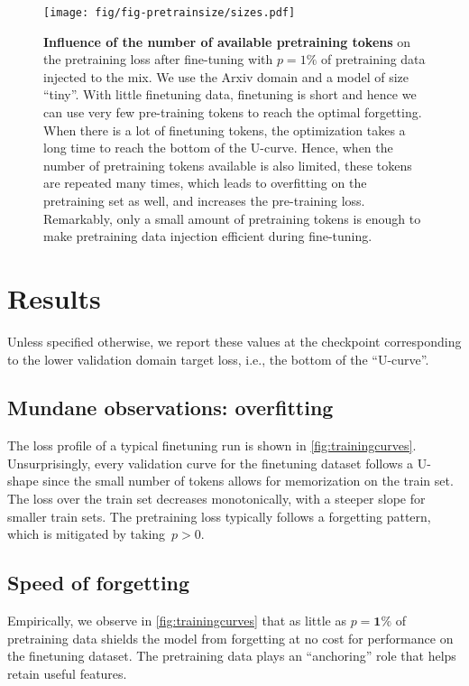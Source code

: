 \begin{figure}[!h]
    \centering
    \texttt{[image: fig/fig-pretrainsize/sizes.pdf]}
    \caption{\textbf{Influence of the number of available pretraining tokens} on the pretraining loss after fine-tuning with $p=1\%$ of pretraining data injected to the mix. We use the Arxiv domain and a model of size ``tiny''.
    With little finetuning data, finetuning is short and hence we can use very few pre-training tokens to reach the optimal forgetting. When there is a lot of finetuning tokens, the optimization takes a long time to reach the bottom of the U-curve. Hence, when the number of pretraining tokens available is also limited, these tokens are repeated many times, which leads to overfitting on the pretraining set as well, and increases the pre-training loss.
    Remarkably, only a small amount of pretraining tokens is enough to make pretraining data injection efficient during fine-tuning.}
    \label{fig:pretrain_size}
\end{figure}

\section{Results}
\label{sec:results}

Unless specified otherwise, we report these values at the checkpoint corresponding to the lower validation domain target loss, i.e., the bottom of the ``U-curve''. 


\subsection{Mundane observations: overfitting}

The loss profile of a typical finetuning run is shown in \autoref{fig:trainingcurves}. Unsurprisingly, every validation curve for the finetuning dataset follows a U-shape since the small number of tokens allows for memorization on the train set. The loss over the train set decreases monotonically, with a steeper slope for smaller train sets. The pretraining loss typically follows a forgetting pattern, which is mitigated by taking~$p>0$.

\vspace{-0.2cm}
\subsection{Speed of forgetting}

Empirically, we observe in \autoref{fig:trainingcurves} that as little as $p=\bm{1}\%$ of pretraining data shields the model from forgetting at no cost for performance on the finetuning dataset. The pretraining data plays an ``anchoring'' role that helps retain useful features.  
  

